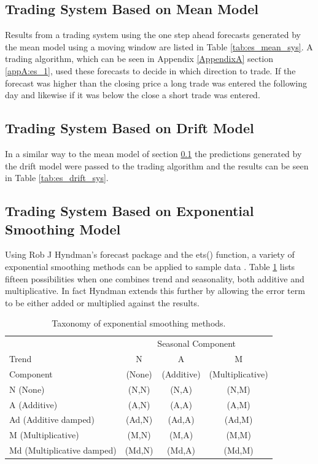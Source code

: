 \subsection{Trading System Based on Mean Model}
\label{sec:es:mean}
Results from a trading system using the one step ahead forecasts generated by the mean model using a moving window are listed in Table \ref{tab:es_mean_sys}. A trading algorithm, which can be seen in Appendix \ref{AppendixA} section \ref{appA:es_1}, used these forecasts to decide in which direction to trade. If the forecast was higher than the closing price a long trade was entered the following day and likewise if it was below the close a short trade was entered.




\subsection{Trading System Based on Drift Model}
In a similar way to the mean model of section \ref{sec:es:mean} the predictions generated by the drift model were passed to the trading algorithm and the results can be seen in Table \ref{tab:es_drift_sys}. 



\subsection{Trading System Based on Exponential Smoothing Model}

Using Rob J Hyndman's forecast package and the ets() function, a variety of exponential smoothing methods can be applied to sample data \citep{Hyndman08automatictime}. Table \ref{tab:tax_em} lists fifteen possibilities when one combines trend and seasonality, both additive and multiplicative. In fact Hyndman extends this further by allowing the error term to be either added or multiplied against the results. 

\begin{table}[ht]
\centering
\caption[Taxonomy of exponential smoothing methods]{Taxonomy of exponential smoothing methods.} 
\label{tab:tax_em}
\begin{tabular}{lccc}
  \toprule 
            & \multicolumn{3}{c}{Seasonal Component} \\
  \cmidrule(r){2-4}
  Trend     & N      & A          & M       \\ 
  Component &(None)  &(Additive)  & (Multiplicative)  \\
  \midrule 
  N (None) & (N,N)&(N,A)&(N,M)  \\ 
  A (Additive) & (A,N)&	(A,A)&(A,M)  \\ 
  Ad (Additive damped) &(Ad,N)&(Ad,A)&(Ad,M) \\ 
  M (Multiplicative) &(M,N)&(M,A)&(M,M)  \\ 
  Md (Multiplicative damped) &(Md,N)&(Md,A)&(Md,M) \\ 
   \bottomrule \end{tabular}
\end{table}

